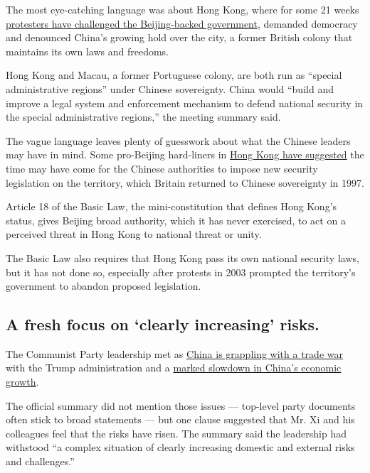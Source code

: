 The most eye-catching language was about Hong Kong, where for some 21
weeks
\href{https://www.nytimes3xbfgragh.onion/2019/10/31/world/asia/hong-kong-halloween.html}{protesters
have challenged the Beijing-backed government}, demanded democracy and
denounced China's growing hold over the city, a former British colony
that maintains its own laws and freedoms.

Hong Kong and Macau, a former Portuguese colony, are both run as
``special administrative regions'' under Chinese sovereignty. China
would ``build and improve a legal system and enforcement mechanism to
defend national security in the special administrative regions,'' the
meeting summary said.

The vague language leaves plenty of guesswork about what the Chinese
leaders may have in mind. Some pro-Beijing hard-liners in
\href{https://www.nytimes3xbfgragh.onion/2019/10/06/world/asia/hong-kong-protests-face-mask-ban.html}{Hong
Kong have suggested} the time may have come for the Chinese authorities
to impose new security legislation on the territory, which Britain
returned to Chinese sovereignty in 1997.

Article 18 of the Basic Law, the mini-constitution that defines Hong
Kong's status, gives Beijing broad authority, which it has never
exercised, to act on a perceived threat in Hong Kong to national threat
or unity.

The Basic Law also requires that Hong Kong pass its own national
security laws, but it has not done so, especially after protests in 2003
prompted the territory's government to abandon proposed legislation.

\hypertarget{a-fresh-focus-on-clearly-increasing-risks}{%
\subsection{A fresh focus on `clearly increasing'
risks.}\label{a-fresh-focus-on-clearly-increasing-risks}}

The Communist Party leadership met as
\href{https://www.nytimes3xbfgragh.onion/2019/10/30/us/politics/us-china-trade-deal.html}{China
is grappling with a trade war} with the Trump administration and a
\href{https://www.nytimes3xbfgragh.onion/2019/10/17/business/china-economic-growth.html}{marked
slowdown in China's economic growth}.

The official summary did not mention those issues --- top-level party
documents often stick to broad statements --- but one clause suggested
that Mr. Xi and his colleagues feel that the risks have risen. The
summary said the leadership had withstood ``a complex situation of
clearly increasing domestic and external risks and challenges.''

